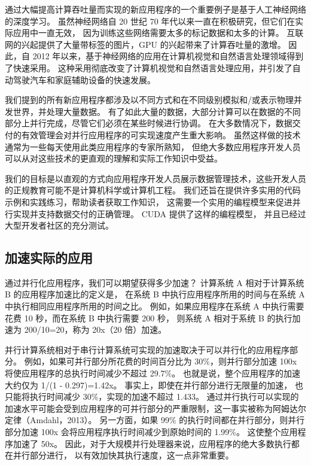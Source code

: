 通过大幅提高计算吞吐量而实现的新应用程序的一个重要例子是基于人工神经网络的深度学习。 
虽然神经网络自 20 世纪 70 年代以来一直在积极研究，但它们在实际应用中一直无效，
因为训练这些网络需要太多的标记数据和太多的计算。 互联网的兴起提供了大量带标签的图片，GPU 的兴起带来了计算吞吐量的激增。 
因此，自 2012 年以来，基于神经网络的应用在计算机视觉和自然语言处理领域得到了快速采用。
这种采用彻底改变了计算机视觉和自然语言处理应用，并引发了自动驾驶汽车和家庭辅助设备的快速发展。

我们提到的所有新应用程序都涉及以不同方式和在不同级别模拟和/或表示物理并发世界，并处理大量数据。 
有了如此大量的数据，大部分计算可以在数据的不同部分上并行完成，尽管它们必须在某些时候进行协调。 
在大多数情况下，数据交付的有效管理会对并行应用程序的可实现速度产生重大影响。 
虽然这样做的技术通常为一些每天使用此类应用程序的专家所熟知，
但绝大多数应用程序开发人员可以从对这些技术的更直观的理解和实际工作知识中受益。

我们的目标是以直观的方式向应用程序开发人员展示数据管理技术，这些开发人员的正规教育可能不是计算机科学或计算机工程。 
我们还旨在提供许多实用的代码示例和实践练习，帮助读者获取工作知识，
这需要一个实用的编程模型来促进并行实现并支持数据交付的正确管理。 CUDA 提供了这样的编程模型，
并且已经过大型开发者社区的充分测试。

\subsection{加速实际的应用}
通过并行化应用程序，我们可以期望获得多少加速？ 计算系统 A 相对于计算系统 B 的应用程序加速比的定义是，
在系统 B 中执行应用程序所用的时间与在系统 A 中执行相同应用程序所用的时间之比。
例如，如果应用程序在系统 A 中执行需要花费 10 秒，而在系统 B 中执行需要 200 秒，
则系统 A 相对于系统 B 的执行加速为 200/10=20，称为 20x（20 倍）加速。

并行计算系统相对于串行计算系统可实现的加速取决于可以并行化的应用程序部分。 
例如，如果可并行部分所花费的时间百分比为 30\%，则并行部分加速 100x 将使应用程序的总执行时间减少不超过 29.7\%。 
也就是说，整个应用程序的加速大约仅为 1/(1 - 0.297)=1.42x。 事实上，即使在并行部分进行无限量的加速，
也只能将执行时间减少 30\%，实现的加速不超过 1.433。 
通过并行执行可以实现的加速水平可能会受到应用程序的可并行部分的严重限制，这一事实被称为阿姆达尔定律（Amdahl，2013）。 
另一方面，如果 99\% 的执行时间都在并行部分，则并行部分加速 100x 会将应用程序执行时间减少到原始时间的 1.99\%。 
这使整个应用程序加速了 50x。 因此，对于大规模并行处理器来说，应用程序的绝大多数执行都在并行部分进行，
以有效加快其执行速度，这一点非常重要。

